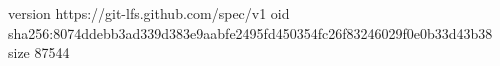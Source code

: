 version https://git-lfs.github.com/spec/v1
oid sha256:8074ddebb3ad339d383e9aabfe2495fd450354fc26f83246029f0e0b33d43b38
size 87544
